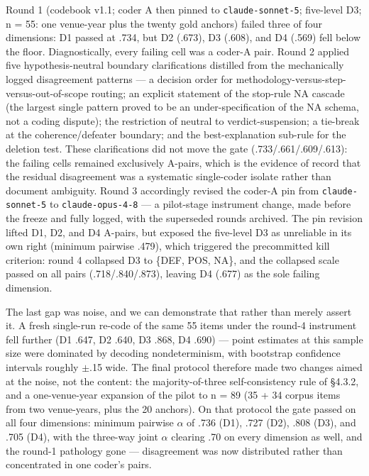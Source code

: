 Round 1 (codebook v1.1; coder A then pinned to \texttt{claude-sonnet-5}; five-level D3; n = 55: one venue-year plus the twenty gold anchors) failed three of four dimensions: D1 passed at .734, but D2 (.673), D3 (.608), and D4 (.569) fell below the floor. Diagnostically, every failing cell was a coder-A pair. Round 2 applied five hypothesis-neutral boundary clarifications distilled from the mechanically logged disagreement patterns --- a decision order for methodology-versus-step-versus-out-of-scope routing; an explicit statement of the stop-rule NA cascade (the largest single pattern proved to be an under-specification of the NA schema, not a coding dispute); the restriction of neutral to verdict-suspension; a tie-break at the coherence/defeater boundary; and the best-explanation sub-rule for the deletion test. These clarifications did not move the gate (.733/.661/.609/.613): the failing cells remained exclusively A-pairs, which is the evidence of record that the residual disagreement was a systematic single-coder isolate rather than document ambiguity. Round 3 accordingly revised the coder-A pin from \texttt{claude-sonnet-5} to \texttt{claude-opus-4-8} --- a pilot-stage instrument change, made before the freeze and fully logged, with the superseded rounds archived. The pin revision lifted D1, D2, and D4 A-pairs, but exposed the five-level D3 as unreliable in its own right (minimum pairwise .479), which triggered the precommitted kill criterion: round 4 collapsed D3 to \{DEF, POS, NA\}, and the collapsed scale passed on all pairs (.718/.840/.873), leaving D4 (.677) as the sole failing dimension.

The last gap was noise, and we can demonstrate that rather than merely assert it. A fresh single-run re-code of the same 55 items under the round-4 instrument fell further (D1 .647, D2 .640, D3 .868, D4 .690) --- point estimates at this sample size were dominated by decoding nondeterminism, with bootstrap confidence intervals roughly $\pm$.15 wide. The final protocol therefore made two changes aimed at the noise, not the content: the majority-of-three self-consistency rule of \S{}4.3.2, and a one-venue-year expansion of the pilot to n = 89 (35 + 34 corpus items from two venue-years, plus the 20 anchors). On that protocol the gate passed on all four dimensions: minimum pairwise $\alpha$ of .736 (D1), .727 (D2), .808 (D3), and .705 (D4), with the three-way joint $\alpha$ clearing .70 on every dimension as well, and the round-1 pathology gone --- disagreement was now distributed rather than concentrated in one coder's pairs.

